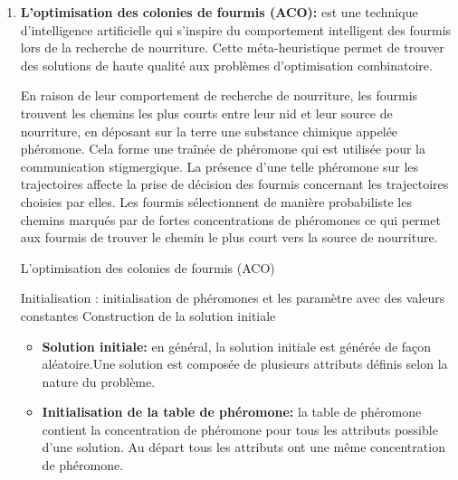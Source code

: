 \begin{enumerate}[label=\alph*)]
\begin{itemize}
\end{itemize}	

	
	\item \textbf{L’optimisation des colonies de fourmis (ACO): }est une technique d’intelligence artificielle qui s'inspire du comportement intelligent des fourmis lors de la recherche de nourriture. Cette méta-heuristique permet de trouver des solutions de haute qualité aux problèmes d’optimisation combinatoire. 

En raison de leur comportement de recherche de nourriture, les fourmis trouvent les chemins les plus courts entre leur nid et leur source de nourriture, en déposant sur la terre une substance chimique appelée phéromone. Cela forme une traînée de phéromone qui est utilisée pour la communication stigmergique. La présence d'une telle phéromone sur les trajectoires affecte la prise de décision des fourmis concernant les trajectoires choisies par elles. Les fourmis sélectionnent de manière probabiliste les chemins marqués par de fortes concentrations de phéromones ce qui permet aux fourmis de trouver le chemin le plus court vers la source de nourriture.

\begin{algorithm}[H]
\caption{L’optimisation des colonies de fourmis (ACO)}
\SetAlgoLined
\DontPrintSemicolon

Initialisation : initialisation de phéromones et les paramètre avec des valeurs constantes \;
Construction de la solution initiale \;

\end{algorithm}

\begin{itemize}
	\item \textbf{Solution initiale:} en général, la solution initiale est générée de façon aléatoire.Une solution est composée de plusieurs attributs définis selon la nature du problème.
	
	\item \textbf{Initialisation de la table de phéromone:} la table de phéromone contient  la concentration de phéromone pour tous les attributs possible d’une solution. Au départ tous les attributs ont une même concentration de phéromone. 
	

\end{itemize}
\end{enumerate}
